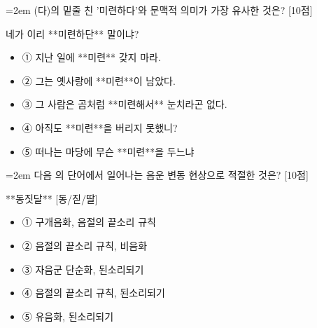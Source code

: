 \documentclass[11pt,a4paper]{article}
\newcommand{\qnum}[1]{%
  \tikz[baseline=(num.base)]{%
    \node[circle, fill=numCircle, text=white, inner sep=0pt,
          minimum size=18pt, font=\small\bfseries] (num) {#1};%
  }%
}
\newcommand{\pts}[1]{%
  \hfill\textcolor{ptsBadge}{[#1점]}%
}
\begin{document}
\vspace{4mm}
\begin{minipage}{\columnwidth}
{\hangindent=2em
\qnum{35}\enspace (다)의 밑줄 친 '미련하다'와 문맥적 의미가 가장 유사한 것은? \pts{10}
\par}

\vspace{3mm}
\begin{tcolorbox}[bogi]
네가 이리 **미련하단** 말이냐?
\end{tcolorbox}
\vspace{3mm}
\begin{itemize}[leftmargin=2.5em, labelsep=0.3em, label={}, itemsep=4pt, parsep=1pt, topsep=0pt]
  \item ① 지난 일에 **미련** 갖지 마라.
  \item ② 그는 옛사랑에 **미련**이 남았다.
  \item ③ 그 사람은 곰처럼 **미련해서** 눈치라곤 없다.
  \item ④ 아직도 **미련**을 버리지 못했니?
  \item ⑤ 떠나는 마당에 무슨 **미련**을 두느냐
\end{itemize}
\end{minipage}
\vspace{4mm}

\vspace{4mm}
\begin{minipage}{\columnwidth}
{\hangindent=2em
\qnum{36}\enspace 다음 의 단어에서 일어나는 음운 변동 현상으로 적절한 것은? \pts{10}
\par}

\vspace{3mm}
\begin{tcolorbox}[bogi]
**동짓달** [동/짇/딸]
\end{tcolorbox}
\vspace{3mm}
\begin{itemize}[leftmargin=2.5em, labelsep=0.3em, label={}, itemsep=4pt, parsep=1pt, topsep=0pt]
  \item ① 구개음화, 음절의 끝소리 규칙
  \item ② 음절의 끝소리 규칙, 비음화
  \item ③ 자음군 단순화, 된소리되기
  \item ④ 음절의 끝소리 규칙, 된소리되기
  \item ⑤ 유음화, 된소리되기
\end{itemize}
\end{minipage}
\vspace{4mm}
\end{document}
